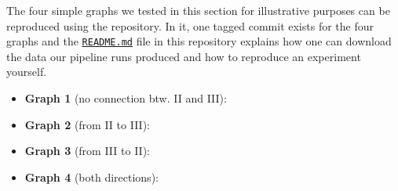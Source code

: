 \begin{tcolorbox}[title=\faIcon{recycle} Reproducibility, parbox=false]
    The four simple graphs we tested in this section for illustrative purposes can be reproduced using the  repository. In it, one tagged commit exists for the four graphs and the \href{https://github.com/rmnldwg/lynference#readme}{ \texttt{README.md}} file in this repository explains how one can download the data our pipeline runs produced and how to reproduce an experiment yourself.

    \begin{itemize}
        \item \textbf{Graph 1} (no connection btw. II and III): 
        \item \textbf{Graph 2} (from II to III): 
        \item \textbf{Graph 3} (from III to II): 
        \item \textbf{Graph 4} (both directions): 
    \end{itemize}
\end{tcolorbox}
